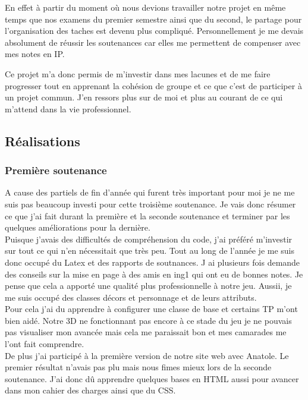 \documentclass[12pt]{article}
\begin{document}
En effet à partir du moment où nous devions travailler notre projet en même  temps que nos examens du premier semestre ainsi que du second, le partage pour l’organisation des taches est devenu plus compliqué. Personnellement je me devais absolument de réussir les soutenances car elles me permettent de compenser avec mes notes en IP.

Ce projet m’a donc permis de m’investir dans mes lacunes et de me faire progresser tout en apprenant la cohésion de groupe et ce que c’est de participer à un projet commun. J’en ressors plus sur de moi et plus au courant de ce qui m’attend dans la vie professionnel.\\

\newpage
\subsection{Réalisations}
\subsubsection{Première soutenance}

A cause des partiels de fin d’année qui furent très important pour moi je ne me suis pas beaucoup investi pour cette troisième soutenance. Je vais donc résumer ce que j’ai fait durant la première et la seconde soutenance et terminer par les quelques améliorations pour la dernière.\\

Puisque j’avais des difficultés de compréhension du code, j’ai préféré m’investir sur tout ce qui n’en nécessitait que très peu. Tout au long de l'année je me suis donc occupé du Latex et des rapports de soutnances. J ai plusieurs fois demande des conseils sur la mise en page à des amis en ing1 qui ont eu de bonnes notes. Je pense que cela a apporté une qualité plus professionnelle à notre jeu. Aussii, je me suis occupé des classes décors et personnage et de leurs attributs.\\ 

 Pour cela j'ai du apprendre à configurer une classe de base et certains TP m'ont bien aidé. Notre 3D ne fonctionnant pas encore à ce stade du jeu je ne pouvais pas visualiser mon avancée mais cela me paraissait bon et mes camarades me l’ont fait comprendre.\\

De plus j’ai participé à la première version de notre site web avec Anatole. Le premier résultat n'avais pas plu mais nous fimes mieux lors de la seconde soutenance. J’ai donc dû apprendre quelques bases en HTML aussi pour avancer dans mon cahier des charges ainsi que du CSS.\\
\end{document}
